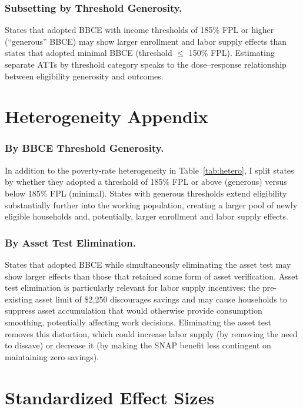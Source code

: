 \documentclass[12pt]{article}
\begin{document}
\subsubsection*{Subsetting by Threshold Generosity.} States that adopted BBCE with income thresholds of 185\% FPL or higher (``generous'' BBCE) may show larger enrollment and labor supply effects than states that adopted minimal BBCE (threshold $\leq$ 150\% FPL). Estimating separate ATTs by threshold category speaks to the dose--response relationship between eligibility generosity and outcomes.

\section{Heterogeneity Appendix}
\label{sec:hetero_appendix}

\subsubsection*{By BBCE Threshold Generosity.} In addition to the poverty-rate heterogeneity in Table~\ref{tab:hetero}, I split states by whether they adopted a threshold of 185\% FPL or above (generous) versus below 185\% FPL (minimal). States with generous thresholds extend eligibility substantially further into the working population, creating a larger pool of newly eligible households and, potentially, larger enrollment and labor supply effects.

\subsubsection*{By Asset Test Elimination.} States that adopted BBCE while simultaneously eliminating the asset test may show larger effects than those that retained some form of asset verification. Asset test elimination is particularly relevant for labor supply incentives: the pre-existing asset limit of \$2,250 discourages savings and may cause households to suppress asset accumulation that would otherwise provide consumption smoothing, potentially affecting work decisions. Eliminating the asset test removes this distortion, which could increase labor supply (by removing the need to dissave) or decrease it (by making the SNAP benefit less contingent on maintaining zero savings).

\section{Standardized Effect Sizes}
\label{sec:sde}


\end{document}
